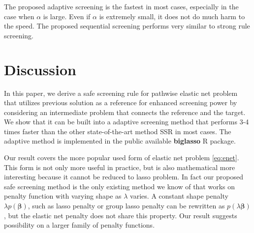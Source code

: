 The proposed adaptive screening is the fastest in most cases, especially in the case when $\alpha$ is large. Even if $\alpha$ is extremely small, it does not do much harm to the speed. The proposed sequential screening performs very similar to strong rule screening.

\section{Discussion}

In this paper, we derive a safe screening rule for pathwise elastic net problem that utilizes previous solution as a reference for enhanced screening power by considering an intermediate problem that connects the reference and the target. We show that it can be built into a adaptive screening method that performs 3-4 times faster than the other state-of-the-art method SSR in most cases. The adaptive method is implemented in the public available \textbf{biglasso} R package.

Our result covers the more popular used form of elastic net problem \eqref{eq:enet}. This form is not only more useful in practice, but is also mathematical more interesting because it cannot be reduced to lasso problem. In fact our proposed safe screening method is the only existing method we know of that works on penalty function with varying shape as $\lambda$ varies. A constant shape penalty $\lambda p(\boldsymbol\beta)$, such as lasso penalty or group lasso penalty can be rewritten as $p(\lambda\boldsymbol\beta)$, but the elastic net penalty does not share this property. Our result suggests possibility on a larger family of penalty functions.

